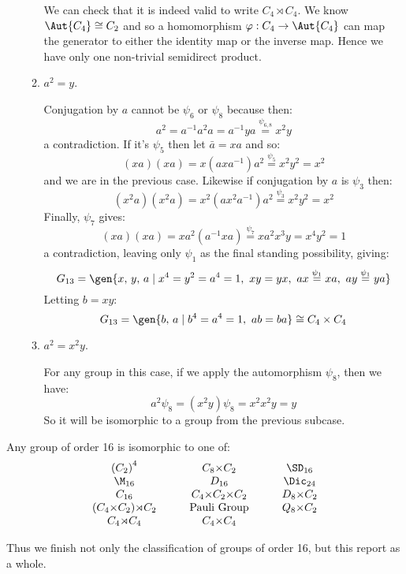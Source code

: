 \begin{enumerate}
\begin{enumerate}[\bfseries A:]
                We can check that it is indeed valid to write \(C_4 \rtimes C_4\).
                We know \(\Aut{C_4} \cong C_2\) and so a homomorphism \(\varphi:C_4 \to \Aut{C_4}\) can map the
                generator to either the identity map or the inverse map.
                Hence we have only one non-trivial semidirect product.
            \item \(a^2 = y\).

                Conjugation by \(a\) cannot be \(\psi_6\) or \(\psi_8\) because then:
                \[a^2 = a^{-1}a^2 a = a^{-1}ya \overset{\psi_{6,8}}{=} x^2 y\]
                a contradiction.
                If it's \(\psi_5\) then let \(\bar{a} = xa\) and so:
                \[(xa)(xa) = x(axa^{-1})a^2 \overset{\psi_5}{=} x^2 y^2 = x^2\]
                and we are in the previous case.
                Likewise if conjugation by \(a\) is \(\psi_3\) then:
                \[(x^2 a)(x^2 a) = x^2(ax^2 a^{-1})a^2 \overset{\psi_3}{=} x^2 y^2 = x^2\]
                Finally, \(\psi_7\) gives:
                \[(xa)(xa) = xa^2(a^{-1}xa) \overset{\psi_7}{=} xa^2 x^3 y = x^4 y^2 = 1\]
                a contradiction, leaving only \(\psi_1\) as the final standing possibility, giving:
                \[G_{13} = \gen{x,\,y,\,a \mid x^4 = y^2 = a^4 = 1,\ xy = yx,\ ax \overset{\psi_1}{=} xa,\ ay \overset{\psi_1}{=} ya}\]
                Letting \(b = xy\):
                \[G_{13} = \gen{b,\,a \mid b^4 = a^4 = 1,\ ab = ba} \cong C_4 \times C_4\]
            \item \(a^2 = x^2 y\).

                For any group in this case, if we apply the automorphism \(\psi_8\), then we have:
                \[a^2\psi_8 = (x^2 y)\psi_8 = x^2 x^2 y = y\]
                So it will be isomorphic to a group from the previous subcase.
        \end{enumerate}
\end{enumerate}

\begin{mdframed}[align=center,nobreak=true]
    \begin{center}
        Any group of order 16 is isomorphic to one of:
        \begin{displaymath}
        \begin{array}{c@{\hskip 3em}c@{\hskip 3em}c}
            {(C_2)}^4 & C_8 {\times} C_2 & \SD_{16} \\
            \M_{16} & D_{16} & \Dic_{24} \\
            C_{16} & C_4 {\times} C_2 {\times} C_2 & D_8 {\times} C_2 \\
            (C_4 {\times} C_2) {\rtimes} C_2 & \text{Pauli Group} & Q_8 {\times} C_2 \\
            C_4 {\rtimes} C_4 & C_4 {\times} C_4 & \\
        \end{array}
        \end{displaymath}
    \end{center}
\end{mdframed}

Thus we finish not only the classification of groups of order 16, but this report as a whole.
